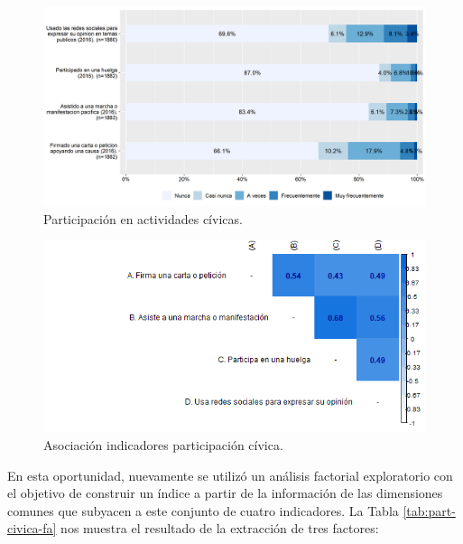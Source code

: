 \documentclass[
  12pt,
]{book}
\begin{document}
\begin{figure}[H]

{\centering \includegraphics[width=1\linewidth,height=1\textheight]{output/graphs/participacion-civica} 

}

\caption{Participación en actividades cívicas.}\label{fig:participacion-civica}
\end{figure}

\begin{figure}[H]

{\centering \includegraphics[width=1\linewidth,height=1\textheight]{output/graphs/participacion-civica_cor} 

}

\caption{Asociación indicadores participación cívica.}\label{fig:participacion-civica-cor}
\end{figure}

En esta oportunidad, nuevamente se utilizó un análisis factorial exploratorio con el objetivo de construir un índice a partir de la información de las dimensiones comunes que subyacen a este conjunto de cuatro indicadores. La Tabla \ref{tab:part-civica-fa} nos muestra el resultado de la extracción de tres factores:
\end{document}
